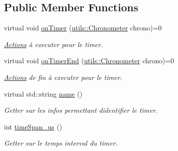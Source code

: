 \subsection*{Public Member Functions}
\begin{DoxyCompactItemize}
\item 
\mbox{\label{classITimerPosixListener_a6f2e614a3dbc1d0eae48c87ee82ae7ee}} 
virtual void \hyperlink{classITimerPosixListener_a6f2e614a3dbc1d0eae48c87ee82ae7ee}{on\+Timer} (\hyperlink{classutils_1_1Chronometer}{utils\+::\+Chronometer} chrono)=0
\begin{DoxyCompactList}\small\item\em \hyperlink{classActions}{Actions} à executer pour le timer. \end{DoxyCompactList}\item 
\mbox{\label{classITimerPosixListener_a4df70962b58b13d521f1f7f91ec6fc13}} 
virtual void \hyperlink{classITimerPosixListener_a4df70962b58b13d521f1f7f91ec6fc13}{on\+Timer\+End} (\hyperlink{classutils_1_1Chronometer}{utils\+::\+Chronometer} chrono)=0
\begin{DoxyCompactList}\small\item\em \hyperlink{classActions}{Actions} de fin à executer pour le timer. \end{DoxyCompactList}\item 
\mbox{\label{classITimerPosixListener_a56abc90e01e315320b855399b2c0096e}} 
virtual std\+::string \hyperlink{classITimerPosixListener_a56abc90e01e315320b855399b2c0096e}{name} ()
\begin{DoxyCompactList}\small\item\em Getter sur les infos permettant d\textquotesingle{}identifier le timer. \end{DoxyCompactList}\item 
\mbox{\label{classITimerPosixListener_a68a996ffa95155e824dec8653fbc8e40}} 
int \hyperlink{classITimerPosixListener_a68a996ffa95155e824dec8653fbc8e40}{time\+Span\+\_\+us} ()
\begin{DoxyCompactList}\small\item\em Getter sur le temps interval du timer. \end{DoxyCompactList}\item 
\mbox{\label{classITimerPosixListener_a89083ecb392fa2f81b4951ba0e2ba824}} 

\end{DoxyCompactItemize}
